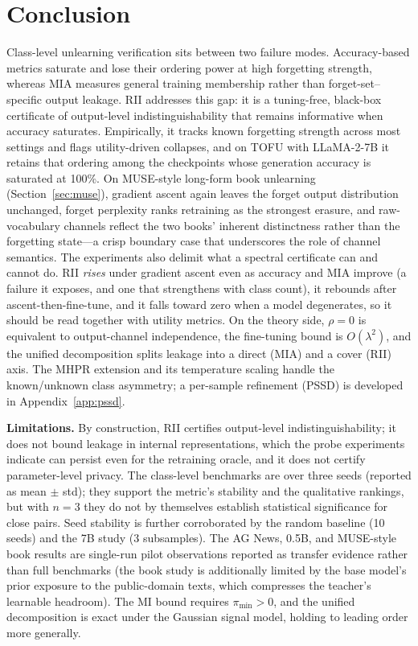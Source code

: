 \documentclass[smallextended]{svjour3}       %
\begin{document}
\section{Conclusion}
\label{sec:conclusion}

Class-level unlearning verification sits between two failure modes. Accuracy-based metrics saturate and lose their ordering power at high forgetting strength, whereas MIA measures general training membership rather than forget-set--specific output leakage. RII addresses this gap: it is a tuning-free, black-box certificate of output-level indistinguishability that remains informative when accuracy saturates. Empirically, it tracks known forgetting strength across most settings and flags utility-driven collapses, and on TOFU with LLaMA-2-7B it retains that ordering among the checkpoints whose generation accuracy is saturated at 100\%. On MUSE-style long-form book unlearning (Section~\ref{sec:muse}), gradient ascent again leaves the forget output distribution unchanged, forget perplexity ranks retraining as the strongest erasure, and raw-vocabulary channels reflect the two books' inherent distinctness rather than the forgetting state---a crisp boundary case that underscores the role of channel semantics. The experiments also delimit what a spectral certificate can and cannot do. RII \emph{rises} under gradient ascent even as accuracy and MIA improve (a failure it exposes, and one that strengthens with class count), it rebounds after ascent-then-fine-tune, and it falls toward zero when a model degenerates, so it should be read together with utility metrics. On the theory side, $\rho=0$ is equivalent to output-channel independence, the fine-tuning bound is $O(\lambda^2)$, and the unified decomposition splits leakage into a direct (MIA) and a cover (RII) axis. The MHPR extension and its temperature scaling handle the known/unknown class asymmetry; a per-sample refinement (PSSD) is developed in Appendix~\ref{app:pssd}.

\textbf{Limitations.} By construction, RII certifies output-level indistinguishability; it does not bound leakage in internal representations, which the probe experiments indicate can persist even for the retraining oracle, and it does not certify parameter-level privacy. The class-level benchmarks are over three seeds (reported as mean $\pm$ std); they support the metric's stability and the qualitative rankings, but with $n{=}3$ they do not by themselves establish statistical significance for close pairs. Seed stability is further corroborated by the random baseline (10 seeds) and the 7B study (3 subsamples). The AG News, 0.5B, and MUSE-style book results are single-run pilot observations reported as transfer evidence rather than full benchmarks (the book study is additionally limited by the base model's prior exposure to the public-domain texts, which compresses the teacher's learnable headroom). The MI bound requires $\pi_{\min}>0$, and the unified decomposition is exact under the Gaussian signal model, holding to leading order more generally.
\end{document}
